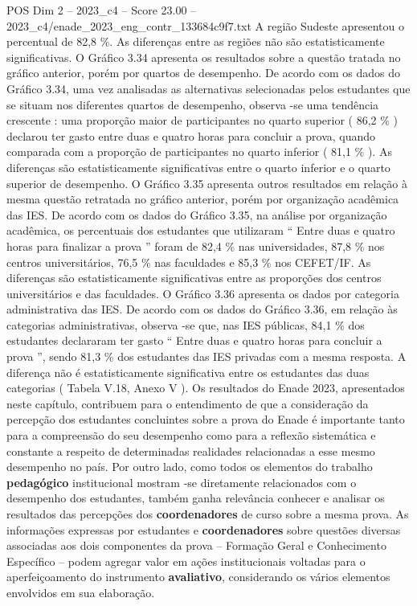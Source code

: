 \begin{textsample}{POS Dim 2 – 2023\_c4 – Score 23.00 – 2023\_c4/enade\_2023\_eng\_contr\_133684c9f7.txt}
A região Sudeste apresentou o percentual de 82,8 \%.
As diferenças entre as regiões não são estatisticamente significativas.
O Gráfico 3.34 apresenta os resultados sobre a questão tratada no gráfico anterior, porém por quartos de desempenho.
De acordo com os dados do Gráfico 3.34, uma vez analisadas as alternativas selecionadas pelos estudantes que se situam nos diferentes quartos de desempenho, observa -se uma tendência crescente : uma proporção maior de participantes no quarto superior ( 86,2 \% ) declarou ter gasto entre duas e quatro horas para concluir a prova, quando comparada com a proporção de participantes no quarto inferior ( 81,1 \% ).
As diferenças são estatisticamente significativas entre o quarto inferior e o quarto superior de desempenho.
O Gráfico 3.35 apresenta outros resultados em relação à mesma questão retratada no gráfico anterior, porém por organização acadêmica das IES.
De acordo com os dados do Gráfico 3.35, na análise por organização acadêmica, os percentuais dos estudantes que utilizaram “ Entre duas e quatro horas para finalizar a prova ” foram de 82,4 \% nas universidades, 87,8 \% nos centros universitários, 76,5 \% nas faculdades e 85,3 \% nos CEFET/IF.
As diferenças são estatisticamente significativas entre as proporções dos centros universitários e das faculdades.
O Gráfico 3.36 apresenta os dados por categoria administrativa das IES.
De acordo com os dados do Gráfico 3.36, em relação às categorias administrativas, observa -se que, nas IES públicas, 84,1 \% dos estudantes declararam ter gasto “ Entre duas e quatro horas para concluir a prova ”, sendo 81,3 \% dos estudantes das IES privadas com a mesma resposta.
A diferença não é estatisticamente significativa entre os estudantes das duas categorias ( Tabela V.18, Anexo V ).
Os resultados do Enade 2023, apresentados neste capítulo, contribuem para o entendimento de que a consideração da percepção dos estudantes concluintes sobre a prova do Enade é importante tanto para a compreensão do seu desempenho como para a reflexão sistemática e constante a respeito de determinadas realidades relacionadas a esse mesmo desempenho no país.
Por outro lado, como todos os elementos do trabalho \textbf{pedagógico} institucional mostram -se diretamente relacionados com o desempenho dos estudantes, também ganha relevância conhecer e analisar os resultados das percepções dos \textbf{coordenadores} de curso sobre a mesma prova.
As informações expressas por estudantes e \textbf{coordenadores} sobre questões diversas associadas aos dois componentes da prova – Formação Geral e Conhecimento Específico – podem agregar valor em ações institucionais voltadas para o aperfeiçoamento do instrumento \textbf{avaliativo}, considerando os vários elementos envolvidos em sua elaboração.

\end{textsample}
